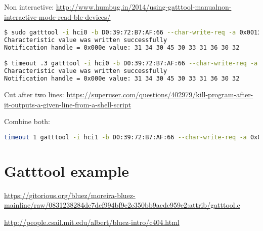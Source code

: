\documentclass[a4paper,10pt]{article}
\newcommand{\link}[1] {\href{#1}{#1}}
\begin{document}
Non interactive:
\link{http://www.humbug.in/2014/using-gatttool-manualnon-interactive-mode-read-ble-devices/} 

\begin{lstlisting}[language=bash]
$ sudo gatttool -i hci0 -b D0:39:72:B7:AF:66 --char-write-req -a 0x0013 -n 14 --listen
Characteristic value was written successfully
Notification handle = 0x000e value: 31 34 30 45 30 33 31 36 30 32

$ timeout .3 gatttool -i hci0 -b D0:39:72:B7:AF:66 --char-write-req -a 0x0013 -n 14 --listen
Characteristic value was written successfully
Notification handle = 0x000e value: 31 34 30 45 30 33 31 36 30 32 
\end{lstlisting}

Cut after two lines:
\link{https://superuser.com/questions/402979/kill-program-after-it-outputs-a-given-line-from-a-shell-script}

Combine both:
\begin{lstlisting}[language=bash]
timeout 1 gatttool -i hci1 -b D0:39:72:B7:AF:66 --char-write-req -a 0x0013 -n 14 --listen | grep -m 1 "value:"
\end{lstlisting}


\section{Gatttool example}
\link{https://gitorious.org/bluez/moreira-bluez-mainline/raw/0831238284de7dcf994bf9e2c350bb9acdc959e2:attrib/gatttool.c} 

\link{http://people.csail.mit.edu/albert/bluez-intro/c404.html}
\end{document}
